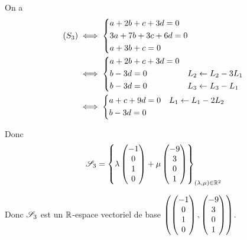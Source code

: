 \begin{corr}[3]
On a \[\begin{aligned}
\left(S_3\right)&\iff\begin{dcases}
a+2b+c+3d=0 \\
3a+7b+3c+6d=0 \\
a+3b+c=0
\end{dcases} \\
&\iff\begin{dcases}
a+2b+c+3d=0 \\
b-3d=0 &L_2\gets L_2-3L_1 \\
b-3d=0 &L_3\gets L_3-L_1
\end{dcases} \\
&\iff\begin{dcases}
a+c+9d=0 &L_1\gets L_1-2L_2 \\
b-3d=0
\end{dcases}
\end{aligned}\]

Donc \[\mathscr{S}_3=\left\lbrace\lambda\begin{pmatrix}-1 \\ 0 \\ 1 \\ 0\end{pmatrix}+\mu\begin{pmatrix}-9 \\ 3 \\ 0 \\ 1\end{pmatrix}\right\rbrace_{\left(\lambda,\mu\right)\in\mathbb{R}^2}\]

Donc \(\mathscr{S}_3\) est un \(\mathbb{R}\)-espace vectoriel de base \(\left(\begin{pmatrix}-1 \\ 0 \\ 1 \\ 0\end{pmatrix},\begin{pmatrix}-9 \\ 3 \\ 0 \\ 1\end{pmatrix}\right)\).
\end{corr}

